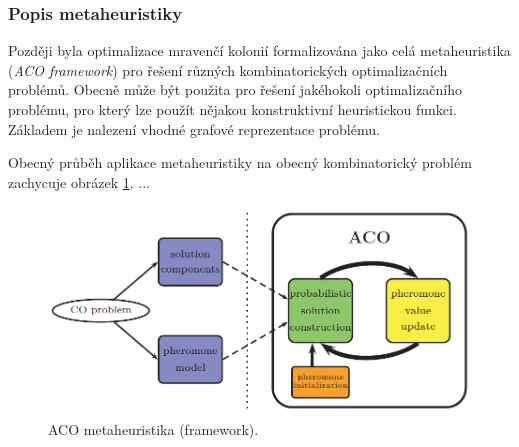 \documentclass[a4paper,12pt]{article}
\begin{document}


\subsubsection{Popis metaheuristiky}
Později byla optimalizace mravenčí kolonií formalizována jako celá metaheuristika ({\it ACO framework}) pro řešení různých kombinatorických
optimalizačních problémů. Obecně může být použita pro řešení jakéhokoli optimalizačního problému, pro který lze
použít nějakou konstruktivní heuristickou funkci. Základem je nalezení vhodné grafové reprezentace problému.

Obecný průběh aplikace metaheuristiky na obecný kombinatorický problém zachycuje obrázek \ref{fig:acofw}.
...





\begin{figure}[here]
  \centering
  \includegraphics[width=14cm]{./img/aco_framework.png}
  \caption{ACO metaheuristika (framework).}
  \label{fig:acofw}
\end{figure}
\end{document}
